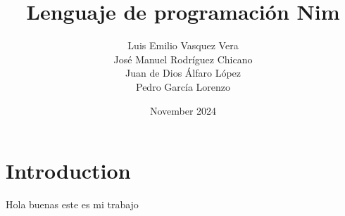 \documentclass{article}
\title{Lenguaje de programación Nim}
\author{Luis Emilio Vasquez Vera
\\José Manuel Rodríguez Chicano
\\Juan de Dios Álfaro López
\\Pedro García Lorenzo}
\date{November 2024}
\begin{document}
\maketitle

\section{Introduction}
Hola buenas este es mi trabajo
\end{document}
